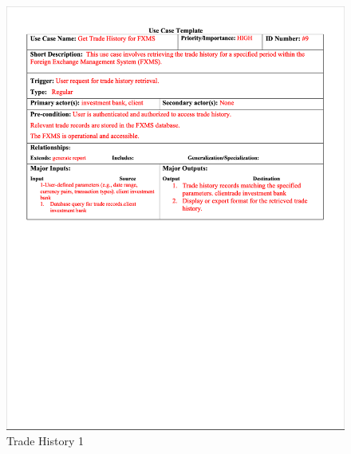 \documentclass[a4paper]{report}
\begin{document}
\begin{figure}[h!]
    \centering
    \includegraphics[width=\textwidth]{images/uc/9.1-trade-history.png}
    \caption{Trade History 1}
    \label{fig:9.1-trade-history}
\end{figure}
\end{document}
